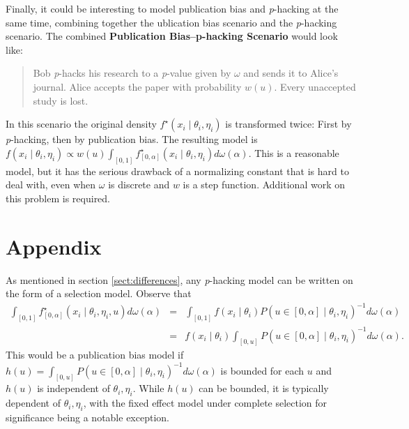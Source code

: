 \documentclass{article}
\theoremstyle{plain}
\theoremstyle{definition}
\begin{document}
Finally, it could be interesting to model publication bias and \textit{p}-hacking at the same time, combining together the ublication bias scenario and the \textit{p}-hacking scenario. The combined \textbf{Publication Bias--p-hacking Scenario} would look like:
\begin{quote}
Bob \textit{p}-hacks his research to a \textit{p}-value given by $\omega$ and sends it to Alice's journal. Alice accepts the paper with probability $w\left(u\right)$. Every unaccepted study is lost.
\end{quote}
In this scenario the original density $f^{\star}\left(x_{i}\mid\theta_{i},\eta_{i}\right)$ is transformed twice: First by \textit{p}-hacking, then by publication bias. The resulting model is $f\left(x_{i}\mid\theta_{i},\eta_{i}\right)\propto w\left(u\right)\int_{[0,1]}f_{[0,\alpha]}^{\star}\left(x_{i}\mid\theta_{i},\eta_{i}\right)d\omega\left(\alpha\right)$. This is a reasonable model, but it has the serious drawback of a normalizing constant that is hard to deal with, even when $\omega$ is discrete and $w$ is a step function. Additional work on this problem is required.

\section*{Appendix}
As mentioned in section \ref{sect:differences}, any \textit{p}-hacking model can be written on the form of a selection model. Observe that
\begin{eqnarray*}
\int_{[0,1]}f_{\left[0,\alpha\right]}^{\star}\left(x_{i}\mid\theta_{i},\eta_{i}, u\right)d\omega\left(\alpha\right) & = & \int_{[0,1]}f\left(x_{i}\mid\theta_{i}\right)P\left(u\in\left[0,\alpha\right]\mid\theta_{i},\eta_{i}\right)^{-1}d\omega\left(\alpha\right)\\
 & = & f\left(x_{i}\mid\theta_{i}\right)\int_{[0,u]}P\left(u\in\left[0,\alpha\right]\mid\theta_{i},\eta_{i}\right)^{-1}d\omega\left(\alpha\right).
\end{eqnarray*}
This would be a publication bias model if $h\left(u\right)=\int_{[0,u]}P\left(u\in\left[0,\alpha\right]\mid\theta_{i},\eta_{i}\right)^{-1}d\omega\left(\alpha\right)$ is bounded for each $u$ and $h\left(u\right)$ is independent of $\theta_{i},\eta_{i}$. While $h\left(u\right)$ can be bounded, it is typically dependent of $\theta_{i},\eta_{i}$, with the fixed effect model under complete selection for significance being a notable exception.
\end{document}
